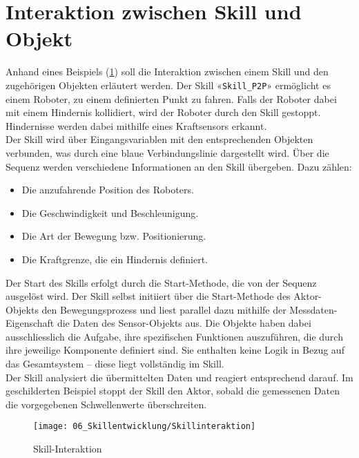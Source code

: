 \section{Interaktion zwischen Skill und Objekt} \label{SkillObjektInteraktion}
	Anhand eines Beispiels (\ref{fig:Skillinteraktion}) soll die Interaktion zwischen einem Skill und den zugehörigen Objekten erläutert werden. Der Skill «\verb|Skill_P2P|» ermöglicht es einem Roboter, zu einem definierten Punkt zu fahren. Falls der Roboter dabei mit einem Hindernis kollidiert, wird der Roboter durch den Skill gestoppt. Hindernisse werden dabei mithilfe eines Kraftsensors erkannt.
	\\
	Der Skill wird über Eingangsvariablen mit den entsprechenden Objekten verbunden, was durch eine blaue Verbindungslinie dargestellt wird. Über die Sequenz werden verschiedene Informationen an den Skill übergeben. Dazu zählen:
	\begin{itemize}
		\item Die anzufahrende Position des Roboters.
		\item Die Geschwindigkeit und Beschleunigung.
		\item Die Art der Bewegung bzw. Positionierung.
		\item Die Kraftgrenze, die ein Hindernis definiert.
	\end{itemize}
	
	Der Start des Skills erfolgt durch die Start-Methode, die von der Sequenz ausgelöst wird. Der Skill selbst initiiert über die Start-Methode des Aktor-Objekts den Bewegungsprozess und liest parallel dazu mithilfe der Messdaten-Eigenschaft die Daten des Sensor-Objekts aus. Die Objekte haben dabei ausschliesslich die Aufgabe, ihre spezifischen Funktionen auszuführen, die durch ihre jeweilige Komponente definiert sind. Sie enthalten keine Logik in Bezug auf das Gesamtsystem – diese liegt vollständig im Skill.
	\\
	Der Skill analysiert die übermittelten Daten und reagiert entsprechend darauf. Im geschilderten Beispiel stoppt der Skill den Aktor, sobald die gemessenen Daten die vorgegebenen Schwellenwerte überschreiten.
	
	\begin{figure}[h!]
		\centering
		\texttt{[image: 06\_Skillentwicklung/Skillinteraktion]}
		\captionsetup{justification=centering}
		\caption{Skill-Interaktion}
		\label{fig:Skillinteraktion}
	\end{figure}
	
	\newpage
	
	
	